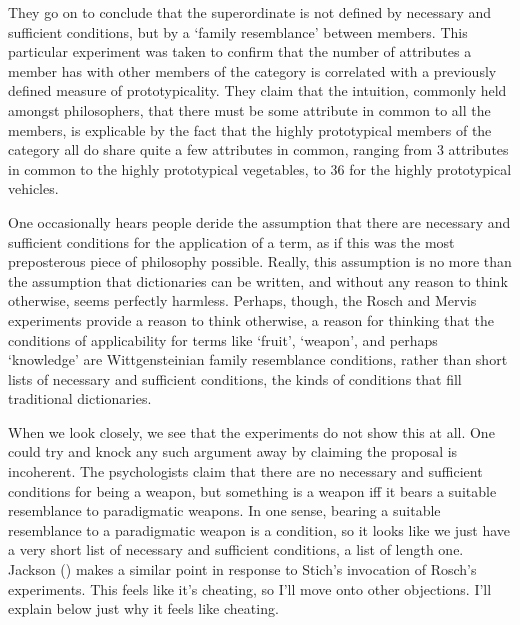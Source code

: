 \documentclass[
  11pt,
  letterpaper,
  DIV=11,
  numbers=noendperiod,
  oneside]{scrartcl}
\begin{document}
They go on to conclude that the superordinate is not defined by
necessary and sufficient conditions, but by a `family resemblance'
between members. This particular experiment was taken to confirm that
the number of attributes a member has with other members of the category
is correlated with a previously defined measure of
prototypicality. They claim that
the intuition, commonly held amongst philosophers, that there must be
some attribute in common to all the members, is explicable by the fact
that the highly prototypical members of the category all do share quite
a few attributes in common, ranging from 3 attributes in common to the
highly prototypical vegetables, to 36 for the highly prototypical
vehicles.

One occasionally hears people deride the assumption that there are
necessary and sufficient conditions for the application of a term, as if
this was the most preposterous piece of philosophy possible. Really,
this assumption is no more than the assumption that dictionaries can be
written, and without any reason to think otherwise, seems perfectly
harmless. Perhaps, though, the Rosch and Mervis experiments provide a
reason to think otherwise, a reason for thinking that the conditions of
applicability for terms like `fruit', `weapon', and perhaps `knowledge'
are Wittgensteinian family resemblance conditions, rather than short
lists of necessary and sufficient conditions, the kinds of conditions
that fill traditional dictionaries.

When we look closely, we see that the experiments do not show this at
all. One could try and knock any such argument away by claiming the
proposal is incoherent. The psychologists claim that there are no
necessary and sufficient conditions for being a weapon, but something is
a weapon iff it bears a suitable resemblance to paradigmatic weapons. In
one sense, bearing a suitable resemblance to a paradigmatic weapon is a
condition, so it looks like we just have a very short list of necessary
and sufficient conditions, a list of length one. Jackson
() makes a similar point in response
to Stich's invocation of Rosch's experiments. This feels like it's
cheating, so I'll move onto other objections. I'll explain below just
why it feels like cheating.
\end{document}
